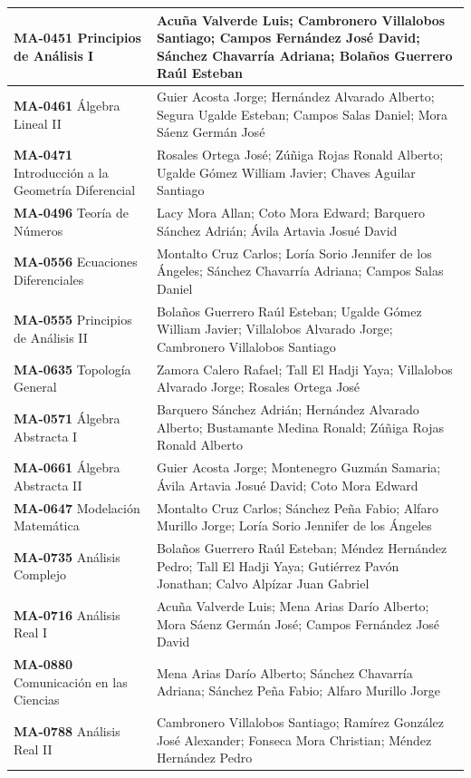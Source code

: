 \begin{longtable}{|>{\raggedright\arraybackslash}p{6.9cm}|>{\raggedright\arraybackslash}p{9.8cm}|}
\textbf{MA-0451} Principios de Análisis I & Acuña Valverde Luis; Cambronero Villalobos Santiago; Campos Fernández José David; Sánchez Chavarría Adriana; Bolaños Guerrero Raúl Esteban \\ \hline
\textbf{MA-0461} Álgebra Lineal II & Guier Acosta Jorge; Hernández Alvarado Alberto; Segura Ugalde Esteban; Campos Salas Daniel; Mora Sáenz Germán José \\ \hline
\textbf{MA-0471} Introducción a la Geometría Diferencial & Rosales Ortega José; Zúñiga Rojas Ronald Alberto; Ugalde Gómez William Javier; Chaves Aguilar Santiago \\ \hline
\textbf{MA-0496} Teoría de Números & Lacy Mora Allan; Coto Mora Edward; Barquero Sánchez Adrián; Ávila Artavia Josué David \\ \hline
\textbf{MA-0556} Ecuaciones Diferenciales & Montalto Cruz Carlos; Loría Sorio Jennifer de los Ángeles; Sánchez Chavarría Adriana; Campos Salas Daniel \\ \hline
\textbf{MA-0555} Principios de Análisis II & Bolaños Guerrero Raúl Esteban; Ugalde Gómez William Javier; Villalobos Alvarado Jorge; Cambronero Villalobos Santiago \\ \hline
\textbf{MA-0635} Topología General & Zamora Calero Rafael; Tall El Hadji Yaya; Villalobos Alvarado Jorge; Rosales Ortega José \\ \hline
\textbf{MA-0571} Álgebra Abstracta I & Barquero Sánchez Adrián; Hernández Alvarado Alberto; Bustamante Medina Ronald; Zúñiga Rojas Ronald Alberto \\ \hline
\textbf{MA-0661} Álgebra Abstracta II & Guier Acosta Jorge; Montenegro Guzmán Samaria; Ávila Artavia Josué David; Coto Mora Edward \\ \hline
\textbf{MA-0647} Modelación Matemática & Montalto Cruz Carlos; Sánchez Peña Fabio; Alfaro Murillo Jorge; Loría Sorio Jennifer de los Ángeles \\ \hline
\textbf{MA-0735} Análisis Complejo & Bolaños Guerrero Raúl Esteban; Méndez Hernández Pedro; Tall El Hadji Yaya; Gutiérrez Pavón Jonathan; Calvo Alpízar Juan Gabriel \\ \hline
\textbf{MA-0716} Análisis Real I & Acuña Valverde Luis; Mena Arias Darío Alberto; Mora Sáenz Germán José; Campos Fernández José David \\ \hline
\textbf{MA-0880} Comunicación en las Ciencias & Mena Arias Darío Alberto; Sánchez Chavarría Adriana; Sánchez Peña Fabio; Alfaro Murillo Jorge \\ \hline
\textbf{MA-0788} Análisis Real II & Cambronero Villalobos Santiago; Ramírez González José Alexander; Fonseca Mora Christian; Méndez Hernández Pedro \\ \hline

\end{longtable}
